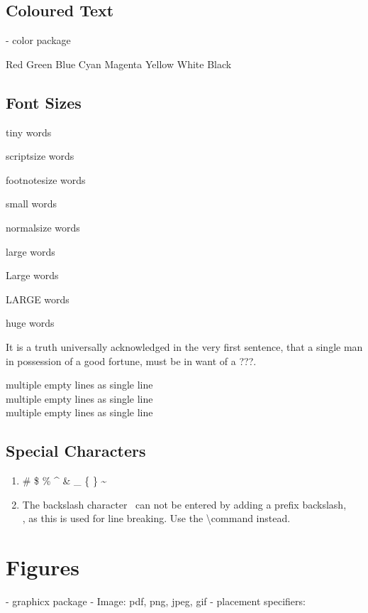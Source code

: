 \documentclass[a4paper,12pt]{article}
\begin{document}
\subsection{Coloured Text}
- color package

{\color{red}Red}
{\color{green}Green}
{\color{blue}Blue}
{\color{cyan}Cyan}
{\color{magenta}Magenta}
{\color{yellow}Yellow}
{\color{white}White}
{\color{black}Black}

\subsection{Font Sizes}

{\tiny tiny words}

{\scriptsize scriptsize words}

{\footnotesize footnotesize words}

{\small small words}

{\normalsize normalsize words}

{\large large words}

{\Large Large words}

{\LARGE LARGE words}

{\huge huge words}


It is a truth universally acknowledged%
in the very first sentence, that a single man in possession of a good fortune, must
be in want of a ???.

multiple empty lines as single line\\
multiple empty lines as single line\\
multiple empty lines as single line

\subsection{Special Characters}

\begin{enumerate}
\item \# \$ \% \^{} \& \_ \{ \} \~{}
\item The backslash character \ can not be entered by adding a prefix backslash,
\\, as this is used for line breaking. Use the \textbackslash command instead.
\end{enumerate}




\section{Figures}
- graphicx package
- Image: pdf, png, jpeg, gif
- placement specifiers:
\end{document}
